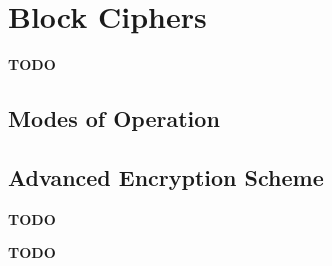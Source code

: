 \section{Block Ciphers}\label{sec:Block_Ciphers}
\begin{definition}\label{def:Block_Cipher}
  \textbf{TODO}
\end{definition}

\subsection{Modes of Operation}\label{subsec:Modes_of_Operation}
\begin{definition}\label{def:Mode_of_Operation}
  
\end{definition}

\subsection{Advanced Encryption Scheme}\label{subsec:AES}
\textbf{TODO}
\begin{definition}\label{def:AES}
  \textbf{TODO}
\end{definition}

